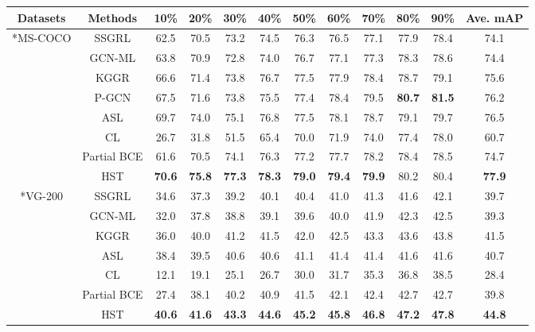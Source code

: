 \begin{table*}
  \centering
  \small
  \begin{tabular}{c|c|ccccccccc|c}
  \hline
  \centering Datasets & Methods & 10\% & 20\% & 30\% & 40\% & 50\% & 60\% & 70\% & 80\% & 90\% & Ave. mAP \\
  \hline
  \hline
  \centering \multirow{8}*{MS-COCO} & SSGRL & 62.5 & 70.5 & 73.2 & 74.5 & 76.3 & 76.5 & 77.1 & 77.9 & 78.4 & 74.1 \\
\centering ~ & GCN-ML & 63.8 & 70.9 & 72.8 & 74.0 & 76.7 & 77.1 & 77.3 & 78.3 & 78.6 & 74.4 \\
  \centering ~ & KGGR & 66.6 & 71.4 & 73.8 & 76.7 & 77.5 & 77.9 & 78.4 & 78.7 & 79.1 & 75.6 \\
  \centering ~ & P-GCN & 67.5 & 71.6 & 73.8 & 75.5 & 77.4 & 78.4 & 79.5 & \textbf{80.7} & \textbf{81.5} & 76.2 \\
  \centering ~ & ASL & 69.7 & 74.0 & 75.1 & 76.8 & 77.5 & 78.1 & 78.7 & 79.1 & 79.7 & 76.5 \\
  \centering ~ & CL & 26.7 & 31.8 & 51.5 & 65.4 & 70.0 & 71.9 & 74.0 & 77.4 & 78.0 & 60.7 \\
  \centering ~ & Partial BCE & 61.6 & 70.5 & 74.1 & 76.3 & 77.2 & 77.7 & 78.2 & 78.4 & 78.5 & 74.7 \\
\centering ~ & HST & \textbf{70.6} & \textbf{75.8} & \textbf{77.3} & \textbf{78.3} & \textbf{79.0} & \textbf{79.4} & \textbf{79.9} & 80.2 & 80.4 & \textbf{77.9} \\
  \hline
  \hline
  \centering \multirow{8}*{VG-200} & SSGRL & 34.6 & 37.3 & 39.2 & 40.1 & 40.4 & 41.0 & 41.3 & 41.6 & 42.1 & 39.7 \\
\centering ~ & GCN-ML & 32.0 & 37.8 & 38.8 & 39.1 & 39.6 & 40.0 & 41.9 & 42.3 & 42.5 & 39.3 \\
  \centering ~ & KGGR & 36.0 & 40.0 & 41.2 & 41.5 & 42.0 & 42.5 & 43.3 & 43.6 & 43.8 & 41.5 \\
\centering ~ & ASL & 38.4 & 39.5 & 40.6 & 40.6 & 41.1 & 41.4 & 41.4 & 41.6 & 41.6 & 40.7 \\
  \centering ~ & CL & 12.1 & 19.1 & 25.1 & 26.7 & 30.0 & 31.7 & 35.3 & 36.8 & 38.5 & 28.4 \\
  \centering ~ & Partial BCE & 27.4 & 38.1 & 40.2 & 40.9 & 41.5 & 42.1 & 42.4 & 42.7 & 42.7 & 39.8 \\
\centering ~ & HST & \textbf{40.6} & \textbf{41.6} & \textbf{43.3} & \textbf{44.6} & \textbf{45.2} & \textbf{45.8} & \textbf{46.8} & \textbf{47.2} & \textbf{47.8} & \textbf{44.8} \\
  \hline

\end{tabular}
\end{table*}
